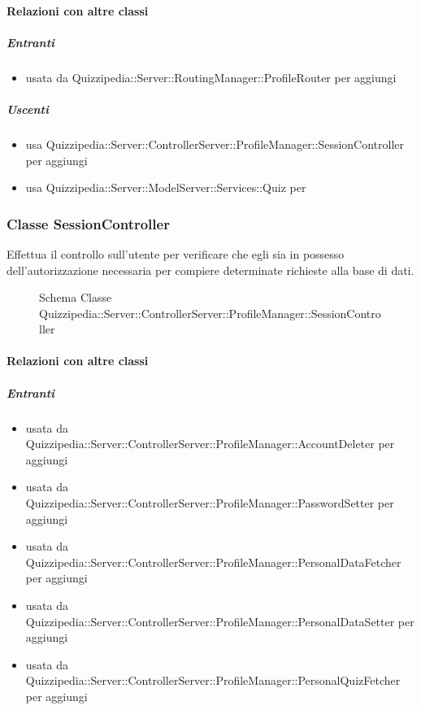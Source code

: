 \paragraph{Relazioni con altre classi}
\subparagraph{Entranti}
\begin{itemize}
\item usata da Quizzipedia::Server::RoutingManager::ProfileRouter per aggiungi
\end{itemize}
\subparagraph{Uscenti}
\begin{itemize}
\item usa Quizzipedia::Server::ControllerServer::ProfileManager::SessionController per aggiungi
\item usa Quizzipedia::Server::ModelServer::Services::Quiz per 
\end{itemize}
\subsubsection{Classe SessionController}
Effettua il controllo sull'utente per verificare che egli sia in possesso dell'autorizzazione necessaria per compiere determinate richieste alla base di dati.
\begin{figure}[H]
\centering
\noindent{}
\caption[Schema Classe SessionController]{Schema Classe Quizzipedia::Server::ControllerServer::ProfileManager::SessionController}
\end{figure}
\paragraph{Relazioni con altre classi}
\subparagraph{Entranti}
\begin{itemize}
\item usata da Quizzipedia::Server::ControllerServer::ProfileManager::AccountDeleter per aggiungi
\item usata da Quizzipedia::Server::ControllerServer::ProfileManager::PasswordSetter per aggiungi
\item usata da Quizzipedia::Server::ControllerServer::ProfileManager::PersonalDataFetcher per aggiungi
\item usata da Quizzipedia::Server::ControllerServer::ProfileManager::PersonalDataSetter per aggiungi
\item usata da Quizzipedia::Server::ControllerServer::ProfileManager::PersonalQuizFetcher per aggiungi
\end{itemize}
